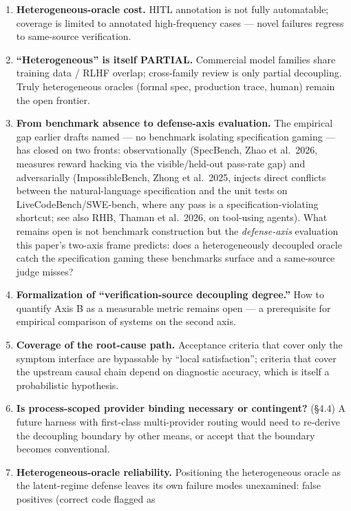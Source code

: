 \documentclass[
  11pt,
]{article}
\providecommand{\tightlist}{%
  \setlength{\itemsep}{0pt}\setlength{\parskip}{0pt}}
\begin{document}
\begin{enumerate}
\def\labelenumi{\arabic{enumi}.}
\tightlist
\item
  \textbf{Heterogeneous-oracle cost.} HITL annotation is not fully
  automatable; coverage is limited to annotated high-frequency cases ---
  novel failures regress to same-source verification.
\item
  \textbf{``Heterogeneous'' is itself PARTIAL.} Commercial model
  families share training data / RLHF overlap; cross-family review is
  only partial decoupling. Truly heterogeneous oracles (formal spec,
  production trace, human) remain the open frontier.
\item
  \textbf{From benchmark absence to defense-axis evaluation.} The
  empirical gap earlier drafts named --- no benchmark isolating
  specification gaming --- has closed on two fronts: observationally
  (SpecBench, Zhao et al.~2026, measures reward hacking via the
  visible/held-out pass-rate gap) and adversarially (ImpossibleBench,
  Zhong et al.~2025, injects direct conflicts between the
  natural-language specification and the unit tests on
  LiveCodeBench/SWE-bench, where any pass is a specification-violating
  shortcut; see also RHB, Thaman et al.~2026, on tool-using agents).
  What remains open is not benchmark construction but the
  \emph{defense-axis} evaluation this paper's two-axis frame predicts:
  does a heterogeneously decoupled oracle catch the specification gaming
  these benchmarks surface and a same-source judge misses?
\item
  \textbf{Formalization of ``verification-source decoupling degree.''}
  How to quantify Axis B as a measurable metric remains open --- a
  prerequisite for empirical comparison of systems on the second axis.
\item
  \textbf{Coverage of the root-cause path.} Acceptance criteria that
  cover only the symptom interface are bypassable by ``local
  satisfaction''; criteria that cover the upstream causal chain depend
  on diagnostic accuracy, which is itself a probabilistic hypothesis.
\item
  \textbf{Is process-scoped provider binding necessary or contingent?}
  (§4.4) A future harness with first-class multi-provider routing would
  need to re-derive the decoupling boundary by other means, or accept
  that the boundary becomes conventional.
\item
  \textbf{Heterogeneous-oracle reliability.} Positioning the
  heterogeneous oracle as the latent-regime defense leaves its own
  failure modes unexamined: false positives (correct code flagged as

\end{enumerate}
\end{document}
